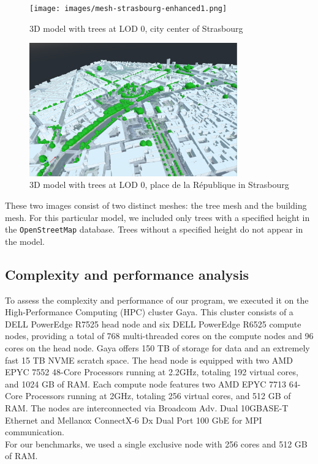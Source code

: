 \documentclass[12pt]{article}
\begin{document}
\begin{figure}[H]
    \centering
    \texttt{[image: images/mesh-strasbourg-enhanced1.png]}
    \caption{3D model with trees at LOD 0, city center of Strasbourg}
\end{figure}

\begin{figure}[H]
    \centering
    \includegraphics[width=0.8\textwidth]{images/mesh-strasbourg-enhanced2.png}
    \caption{3D model with trees at LOD 0, place de la République in Strasbourg}
\end{figure}

These two images consist of two distinct meshes: the tree mesh and the building
mesh. For this particular model, we included only trees with a specified height
in the \texttt{OpenStreetMap} database. Trees without a specified height do not
appear in the model.

\subsection{Complexity and performance analysis}

To assess the complexity and performance of our program, we executed it on
the High-Performance Computing (HPC) cluster Gaya. This cluster consists of a
DELL PowerEdge R7525 head node and six DELL PowerEdge R6525 compute nodes,
providing a total of 768 multi-threaded cores on the compute nodes and 96 cores
on the head node. Gaya offers 150 TB of storage for data and an extremely fast
15 TB NVME scratch space. The head node is equipped with two AMD EPYC 7552
48-Core Processors running at 2.2GHz, totaling 192 virtual cores, and 1024
GB of RAM. Each compute node features two AMD EPYC 7713 64-Core Processors
running at 2GHz, totaling 256 virtual cores, and 512 GB of RAM.
The nodes are interconnected via Broadcom Adv. Dual 10GBASE-T Ethernet and
Mellanox ConnectX-6 Dx Dual Port 100 GbE for MPI communication.\\
For our benchmarks, we used a single exclusive node with 256 cores and 512 GB
of RAM.
\end{document}
